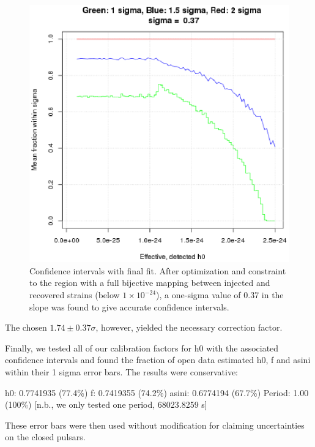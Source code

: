 \begin{figure}
\begin{center}
\includegraphics[width=0.3\paperwidth,height=0.2\paperheight]{PlotSigmaDiffVsH0Eff.eps}
\caption{Confidence intervals with final fit. After optimization and constraint to the region with a full bijective mapping between injected and recovered strains (below $1 \times 10^{-24}$), a one-sigma value of 0.37 in the slope was found to give accurate confidence intervals.
}
\end{center}
\end{figure}



The chosen $1.74 \pm 0.37 \sigma$, however, yielded the necessary correction factor.

Finally, we tested all of our calibration factors for h0 with the associated confidence intervals and found the fraction of open data estimated h0, f and asini within their 1 sigma error bars. The results were conservative:

h0: 0.7741935 (77.4\%)
f: 0.7419355 (74.2\%)
asini: 0.6774194 (67.7\%)
Period: 1.00 (100\%) [n.b., we only tested one period, 68023.8259 s]

These error bars were then used without modification for claiming uncertainties on the closed pulsars.



